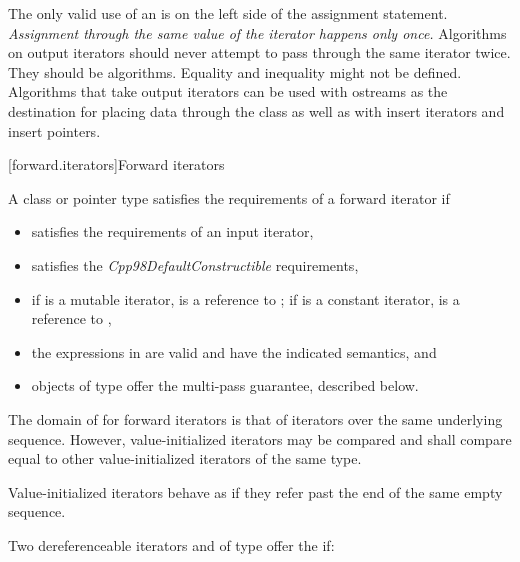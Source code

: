 \pnum
\begin{note}
The only valid use of an
is on the left side of the assignment statement.
\textit{Assignment through the same value of the iterator happens only once.}
Algorithms on output iterators should never attempt to pass through the same iterator twice.
They should be
algorithms.
Equality and inequality might not be defined.
Algorithms that take output iterators can be used with ostreams as the destination
for placing data through the
class as well as with insert iterators and insert pointers.
\end{note}

[forward.iterators]{Forward iterators}

\pnum
A class or pointer type
satisfies the requirements of a forward iterator if

\begin{itemize}
\item {} satisfies the requirements of an input iterator,

\item {} satisfies the \textit{Cpp98DefaultConstructible}
requirements,

\item if  is a mutable iterator,  is a reference to ;
if  is a constant iterator,  is a reference to ,

\item the expressions in 
are valid and have the indicated semantics, and

\item objects of type  offer the multi-pass guarantee, described below.
\end{itemize}

\pnum
The domain of \tcode{==} for forward iterators is that of iterators over the same
underlying sequence. However, value-initialized iterators may be compared and
shall compare equal to other value-initialized iterators of the same type.
\begin{note} Value-initialized iterators behave as if they refer past the end of
the same empty sequence. \end{note}

\pnum
Two dereferenceable iterators  and  of type  offer the
 if:

